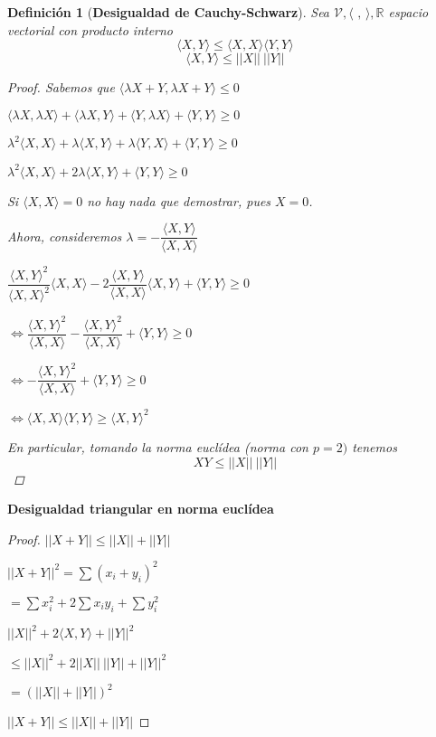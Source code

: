 \documentclass[12pt]{article}
\newtheorem{dfn}[thm]{Definición}
\begin{document}
\begin{dfn}[\textbf{Desigualdad de Cauchy-Schwarz}]
Sea $\mathcal{V}, \langle \text{ , } \rangle, \mathbb{R}$ espacio vectorial con producto interno 
$$\langle X,Y \rangle \leq \langle X,X \rangle \langle Y,Y \rangle$$
$$\langle X,Y \rangle \leq ||X|| ~ ||Y||$$
\begin{proof}
    

Sabemos que $\langle \lambda X+Y, \lambda X + Y \rangle \leq 0$ 

$\langle \lambda X, \lambda X \rangle + \langle \lambda X, Y \rangle + \langle Y, \lambda X \rangle + \langle Y,Y \rangle \geq 0$ 

$\lambda ^2 \langle X,X \rangle + \lambda \langle X,Y \rangle + \lambda \langle Y,X \rangle + \langle Y,Y \rangle \geq 0$

$\lambda^2 \langle X, X \rangle + 2 \lambda \langle X,Y \rangle + \langle Y, Y \rangle \geq 0$

Si $\langle X,X \rangle = 0$ no hay nada que demostrar, pues $X = 0$. 

Ahora, consideremos $\lambda = - \dfrac{\langle X, Y \rangle}{\langle X, X \rangle}$ 

$\dfrac{\langle X, Y\rangle ^2}{ \langle X,X \rangle ^2} \langle X,X \rangle - 2 \dfrac{\langle X, Y \rangle}{\langle X, X \rangle} \langle X, Y \rangle + \langle Y,Y \rangle \geq 0$

$\iff \dfrac{\langle X, Y\rangle ^2}{ \langle X,X \rangle }  - \dfrac{\langle X, Y \rangle ^2}{\langle X, X \rangle } + \langle Y, Y \rangle \geq 0$

$\iff - \dfrac{\langle X, Y\rangle ^2}{ \langle X,X \rangle } + \langle Y, Y \rangle \geq 0 $

$\iff \langle X,X \rangle \langle Y,Y\rangle \geq \langle X,Y \rangle ^2$

En particular, tomando la norma euclídea (norma con $p=2)$ tenemos
$$XY \leq ||X|| ~ ||Y||$$    
\end{proof}
\end{dfn}

\noindent \textbf{Desigualdad triangular en norma euclídea}\\


\begin{proof} $||X+Y|| \leq ||X||+||Y||$ 

$||X+Y||^2 = \sum (x_i + y_i)^2$

$= \sum x_{i}^2 + 2 \sum x_i y_i + \sum y_{i}^2$

$ ||X||^2 + 2 \langle X,Y \rangle + ||Y||^2$

$\leq ||X||^2 + 2 ||X|| ~ ||Y|| + ||Y||^2$

$ = (||X|| + ||Y||) ^2$

$||X+Y|| \leq ||X||+||Y||$
    \end{proof}
\end{document}
